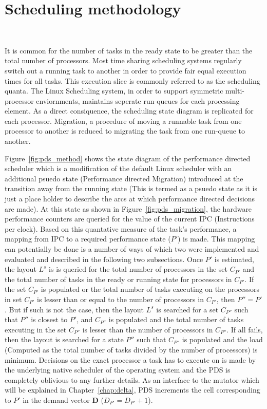\section{Scheduling methodology}~\label{sec:pds}

It is common for the number of tasks in the ready state to be greater than the total number
of processors. Most time sharing scheduling systems regularly switch out a running task
to another in order to provide fair equal execution times for all tasks. This execution slice is commonly 
referred to as the scheduling quanta. The Linux Scheduling system, in order to support symmetric 
multi-processor enviornments, maintains seperate run-queues
for each processing element. As a direct consiquence, the scheduling state diagram is replicated for each processor. 
Migration, a procedure of moving a runnable task from one processor to another is reduced to migrating the task from
one run-queue to another. 

Figure~\ref{fig:pds_method} shows the state diagram of the performance directed scheduler which is a modification of
the default Linux scheduler with an additional psuedo state (Performance directed Migration) introduced at the transition 
away from the running state (This is termed as a psuedo state as it is just a place holder to describe the arcs at 
which performance directed decisions are made). At this state as shown in Figure~\ref{fig:pds_migration}, the hardware 
performance counters are queried for the value of the current IPC (Instructions per clock). 
Based on this quantative measure of the task's performance,
a mapping from IPC to a required performance state ($P'$) is made. This mapping can potentially be done is a number of ways 
of which two were implemented and evaluated and described in the following two subsections. Once $P'$ is estimated, 
the layout $L^s$ is is queried for the total number of processors in the set $C_{P'}$ and the total number of tasks in the 
ready or running state for processors in $C_{P'}$. If the set $C_{P'}$ is populated or the total number of tasks executing 
on the processors in set $C_{P'}$ is lesser than or equal
to the number of processors in $C_{P'}$, then $P'' = P'$. But if such is not the case, then the layout $L^s$ is searched
for a set $C_{P''}$ such that $P''$ is closest to $P'$, and $C_{P''}$ is populated and the total number of tasks 
executing in the set $C_{P''}$ is lesser than the number of processors in $C_{P''}$. If all fails, then the layout
is searched for a state $P''$ such that $C_{P''}$ is populated and the load (Computed as the total number of tasks 
divided by the number of processors) is minimum. Decisions on the exact processor a task has to execute on is made by the 
underlying native scheduler of the operating system and the PDS is completely oblivious to any further details.
As an interface to the mutator which will be explained in Chapter~\ref{chap:delta}, PDS
increments the cell corresponding to $P'$ in the demand vector \textbf{D} ($D_{P'} = D_{P'} + 1$).

